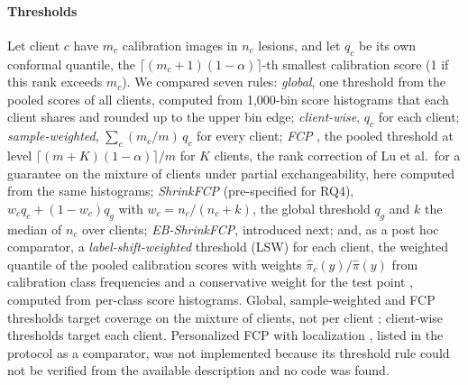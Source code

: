 \documentclass[VANCOUVER,Times1COL]{WileyNJDv5}
\begin{document}
\paragraph{Thresholds} Let client $c$ have $m_c$ calibration images in $n_c$ lesions, and let $q_c$ be
its own conformal quantile, the $\lceil (m_c+1)(1-\alpha)\rceil$-th smallest calibration score (1 if this
rank exceeds $m_c$). We compared seven rules:
\emph{global}, one threshold from the pooled scores of all clients, computed from 1,000-bin score
histograms that each client shares and rounded up to the upper bin edge;
\emph{client-wise}, $q_c$ for each client;
\emph{sample-weighted}, $\sum_c (m_c/m)\,q_c$ for every client;
\emph{FCP} \cite{lu2023fcp}, the pooled threshold at level $\lceil (m+K)(1-\alpha)\rceil/m$ for $K$
clients, the rank correction of Lu et al.\ for a guarantee on the mixture of clients under partial
exchangeability, here computed from the same histograms;
\emph{ShrinkFCP} (pre-specified for RQ4), $w_c q_c + (1-w_c) q_g$ with $w_c=n_c/(n_c+k)$, the global
threshold $q_g$ and $k$ the median of $n_c$ over clients;
\emph{EB-ShrinkFCP}, introduced next; and, as a post hoc comparator, a \emph{label-shift-weighted}
threshold (LSW) for each client, the weighted quantile of the pooled calibration scores with weights
$\hat\pi_c(y)/\hat\pi(y)$ from calibration class frequencies and a conservative weight for the test point
\cite{podkopaev2021labelshift,plassier2023labelshift}, computed from per-class score histograms. Global,
sample-weighted and FCP thresholds target coverage on the mixture of clients, not per client
\cite{lu2023fcp}; client-wise thresholds target each client. Personalized FCP with localization
\cite{min2025pfcp}, listed in the protocol as a comparator, was not implemented because its threshold
rule could not be verified from the available description and no code was found.
\end{document}
